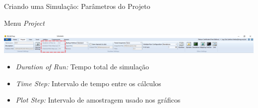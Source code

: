 \begin{frame}{Criando uma Simulação: Parâmetros do Projeto}
\centering

Menu {\it Project}

\includegraphics[width=0.95\linewidth]{./figuras/Primeiros-Passos/Project_parameters}


\begin{itemize}
\item {\it Duration of Run:} Tempo total de simulação
\vspace*{0.5cm}
\item {\it Time Step:} Intervalo de tempo entre os cálculos
\vspace*{0.5cm}
\item {\it Plot Step:} Intervalo de amostragem usado nos gráficos
\end{itemize}


\end{frame}





